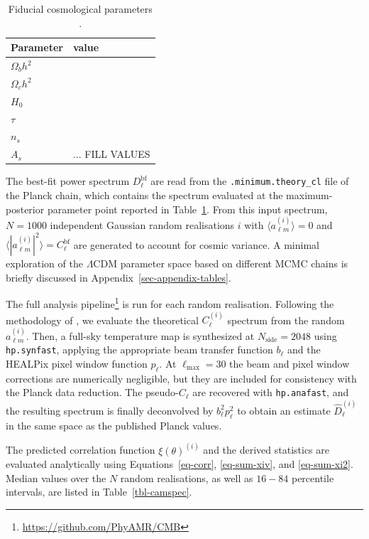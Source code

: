 \documentclass[apj,twocolumn,numberedappendix]{openjournal}
\begin{document}
\begin{table}
	\centering
	\caption{Fiducial cosmological parameters \citep{cosmoplanck_2020}.}
	\label{tbl-bestfit-params}
	\begin{tabular}{ll}
		\toprule
		Parameter & value \\
		\midrule
		$\Omega_b h^2$ & \\
		$\Omega_c h^2$ & \\
		$H_0$ & \\
		$\tau$ & \\
		$n_s$ & \\
		$A_s$ & ... FILL VALUES\\
		\bottomrule
	\end{tabular}
\end{table}

The best-fit power spectrum $D_\ell^\mathrm{bf}$ are read from the \texttt{.minimum.theory\_cl} file of the Planck chain, which contains the spectrum evaluated at the maximum-posterior parameter point reported in Table~\ref{tbl-bestfit-params}.
From this input spectrum, $N=1000$ independent Gaussian random realisations $i$ with $\langle a_{\ell m}^{(i)} \rangle = 0$ and  $\langle |a_{\ell m}^{(i)}|^2 \rangle = C_\ell^\mathrm{bf}$ are generated to account for cosmic variance.
A minimal exploration of the $\Lambda$CDM parameter space based on different MCMC chains is briefly discussed in Appendix~\ref{sec-appendix-tables}.

The full analysis pipeline\footnote{\url{https://github.com/PhyAMR/CMB}} is run for each random realisation.
Following the methodology of \citet{sullivan2024methodscmbmapanalysis}, we evaluate the theoretical $C_\ell^{(i)}$ spectrum from the random $a_{\ell m}^{(i)}$.
Then, a full-sky temperature map is synthesized at $N_\mathrm{side} = 2048$ using
\texttt{hp.synfast}, applying the appropriate beam transfer function $b_\ell$ and the HEALPix pixel window function $p_\ell$.
At $\ell_\mathrm{max} = 30$ the beam and pixel window corrections are numerically negligible, but
they are included for consistency with the Planck data reduction.
The pseudo-$C_\ell$ are recovered with \texttt{hp.anafast}, and the resulting spectrum is finally deconvolved by $b_\ell^2 p_\ell^2$ to obtain an estimate $\hat{D}_\ell^{(i)}$ in the same space as the published Planck values.

The predicted correlation function $\xi(\theta)^{(i)}$ and the derived statistics are evaluated analytically using Equations~\eqref{eq-corr}, \eqref{eq-sum-xiv}, and \eqref{eq-sum-xi2}.
Median values over the $N$ random realisations, as well as $16-84$ percentile intervals, are listed in Table~\ref{tbl-camspec}.
\end{document}
